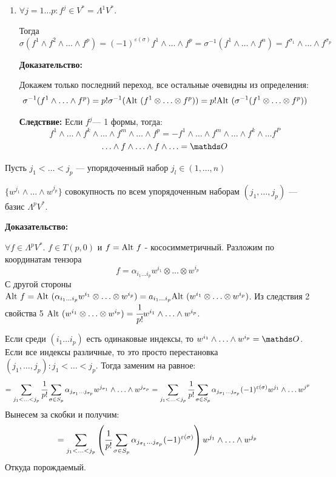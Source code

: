 \begin{enumerate}
    \item $\forall j=1\ldots p : f^j \in V^*= \Lambda^1V^*$.
    
    Тогда $$\sigma(f^1 \wedge f^2 \wedge \ldots\wedge  f^p) = (-1)^{\varepsilon(\sigma)}f^1\wedge \ldots \wedge f^p = \sigma^{-1}(f^1\wedge \ldots \wedge f^n) = f^{\sigma_1}\wedge \ldots \wedge f^{\sigma_p}$$

    \textbf{Доказательство:}

    Докажем только последний переход, все остальные очевидны из определения:
    $$\sigma^{-1}(f^1 \wedge \ldots \wedge f^p ) = p! \sigma^{-1}(\text{Alt } (f^1 \otimes \ldots \otimes f^p )) =p!\text{Alt } (\sigma^{-1}(f^1 \otimes \ldots \otimes f^p)) $$

    \textbf{Следствие:} Если $f^j$--- 1 формы, тогда:
    $$f^1 \wedge \ldots \wedge f^k \wedge \ldots \wedge f^m \wedge \ldots \wedge f^p = -f^1 \wedge \ldots \wedge f^m \wedge \ldots \wedge f^k \wedge \ldots f^P$$
    $$\ldots \wedge f \wedge \ldots \wedge f \wedge \ldots = \zero$$
\end{enumerate}


Пусть $j_1 < \ldots  < j_p$ --- упорядоченный набор $j_l \in (1,\ldots,n)$

$\{w^{j_1}\wedge \ldots \wedge w^{j_p}\}$ совокупность по всем упорядоченным наборам $(j_1,\ldots, j_p)$ --- базис $\Lambda^pV^*$.

\textbf{Доказательство:}


$\forall f \in \Lambda^p V^*$. $f\in T(p,0)$ и $f = \text{Alt } f$ - кососимметричный. Разложим по координатам тензора
$$f= \alpha_{i_1\ldots i_p} w^{i_1}\otimes \ldots \otimes w^{i_p}$$
С другой стороны $\text{Alt } f = \text{Alt } (\alpha_{i_1\ldots i_p}w^{i_1}\otimes  \ldots \otimes w^{i_p}) = a_{i_1\ldots i_p}\text{Alt } (w^{i_1}\otimes \ldots \otimes w^{i_p})$. Из следствия 2 свойства 5 $\text{Alt } (w^{i_1}\otimes \ldots \otimes w^{i_p}) = \cfrac{1}{p!}w^{i_1}\wedge \ldots \wedge w^{i_p}$. 

Если среди $(i_1\ldots i_p)$ есть одинаковые индексы, то $w^{i_1} \wedge \ldots \wedge w^{i_p} = \zero$. Если все индексы различные, то это просто перестановка $(j_1,\ldots,j_p): j_1<\ldots <j_p$. Тогда заменим на равное:
$$=\sum_{j_1<\ldots<j_p}\cfrac{1}{p!}\sum\limits_{\sigma \in S_p} \alpha_{j_{\sigma_1}\ldots j_{\sigma_p}} w^{j_{\sigma_1}}\wedge \ldots \wedge w^{j_{\sigma_p}} = \sum_{j_1<\ldots<j_p}\cfrac{1}{p!}\sum\limits_{\sigma \in S_p} \alpha_{j_{\sigma_1}\ldots j_{\sigma_p}} (-1)^{\varepsilon(\sigma)}w^{j_1}\wedge \ldots w^{j^p}$$
Вынесем за скобки и получим:
$$=\sum_{j_1<\ldots<j_p}\left(\cfrac{1}{p!}\sum\limits_{\sigma \in S_p}\alpha_{j_{\sigma_1}\ldots j_{\sigma_p}}(-1)^{\varepsilon(\sigma)}\right)w^{j_1}\wedge \ldots \wedge w^{j_p}$$
Откуда порождаемый.

